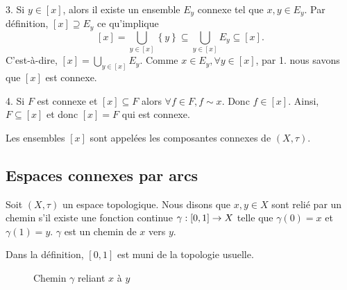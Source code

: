 \documentclass[french]{article}
\begin{document}
\begin{lemme}
\begin{preuve}
    \par 3. Si $y \in [x]$, alors il existe un ensemble $E_y$ connexe tel que $x, y \in E_y$. Par définition, $[x] \supseteq E_y$ ce qu'implique
    $$[x] = \bigcup_{y \in [x]} \left\{ y \right\} \subseteq \bigcup_{y \in [x]} E_y \subseteq [x].$$
    C'est-à-dire, $[x] = \bigcup\limits_{y \in [x]} E_y$. Comme $x \in E_y, \forall y \in [x]$, par 1. nous savons que $[x]$ est connexe.
    \par 4. Si $F$ est connexe et $[x] \subseteq F$ alors $\forall f \in F, f \sim x$. Donc $f \in [x]$. Ainsi, $F \subseteq [x]$ et donc $[x] = F$ qui est connexe.
  \end{preuve}
\end{lemme}
Les ensembles $[x]$ sont appelées les composantes connexes de $(X, \tau)$.

\subsection{Espaces connexes par arcs}
\begin{definition}
  Soit $(X, \tau)$ un espace topologique. Nous disons que $x, y \in X$ sont relié par un chemin s'il existe une fonction continue $\gamma: [0, 1] \rightarrow X$ telle que $\gamma(0) = x$ et $\gamma(1) = y$. $\gamma$ est un chemin de $x$ vers $y$.
\end{definition}
Dans la définition, $[0, 1]$ est muni de la topologie usuelle.
\begin{figure}[ht]
  \centering
  \caption{Chemin $\gamma$ reliant $x$ à $y$}
\end{figure}
\end{document}
